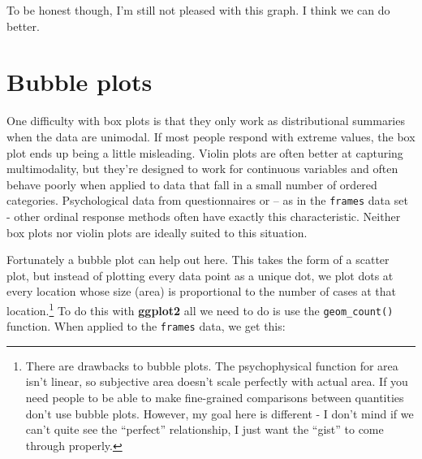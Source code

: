 \documentclass[]{book}
\newenvironment{Shaded}{\begin{snugshade}}{\end{snugshade}}
\newcommand{\DataTypeTok}[1]{\textcolor[rgb]{0.13,0.29,0.53}{#1}}
\newcommand{\KeywordTok}[1]{\textcolor[rgb]{0.13,0.29,0.53}{\textbf{#1}}}
\newcommand{\NormalTok}[1]{#1}
\newcommand{\OperatorTok}[1]{\textcolor[rgb]{0.81,0.36,0.00}{\textbf{#1}}}
\newcommand{\StringTok}[1]{\textcolor[rgb]{0.31,0.60,0.02}{#1}}
\let\rmarkdownfootnote\footnote%
\def\footnote{\protect\rmarkdownfootnote}
\begin{document}
To be honest though, I'm still not pleased with this graph. I think we can do better.

\hypertarget{bubble-plots}{%
\section{Bubble plots}\label{bubble-plots}}

One difficulty with box plots is that they only work as distributional summaries when the data are unimodal. If most people respond with extreme values, the box plot ends up being a little misleading. Violin plots are often better at capturing multimodality, but they're designed to work for continuous variables and often behave poorly when applied to data that fall in a small number of ordered categories. Psychological data from questionnaires or -- as in the \texttt{frames} data set - other ordinal response methods often have exactly this characteristic. Neither box plots nor violin plots are ideally suited to this situation.

Fortunately a bubble plot can help out here. This takes the form of a scatter plot, but instead of plotting every data point as a unique dot, we plot dots at every location whose size (area) is proportional to the number of cases at that location.\footnote{There are drawbacks to bubble plots. The psychophysical function for area isn't linear, so subjective area doesn't scale perfectly with actual area. If you need people to be able to make fine-grained comparisons between quantities don't use bubble plots. However, my goal here is different - I don't mind if we can't quite see the ``perfect'' relationship, I just want the ``gist'' to come through properly.} To do this with \textbf{ggplot2} all we need to do is use the \texttt{geom\_count()} function. When applied to the \texttt{frames} data, we get this:

\begin{Shaded}
\end{Shaded}
\end{document}
